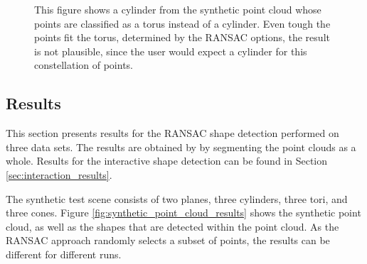\begin{figure}[h]
\centering
{}%
{}      
\caption{This figure shows a cylinder from the synthetic point cloud whose points are classified as a torus instead of a cylinder. Even tough the points fit the torus, determined by the RANSAC options, the result is not plausible, since the user would expect a cylinder for this constellation of points. }
\label{fig:missfittedTorus}
\end{figure}


\subsection{Results}

This section presents results for the RANSAC shape detection performed on three data sets. The results are obtained by by segmenting the point clouds as a whole. Results for the interactive shape detection can be found in Section \ref{sec:interaction_results}. 

The synthetic test scene consists of two planes, three cylinders, three tori, and three cones.  Figure \ref{fig:synthetic_point_cloud_results} shows the synthetic point cloud, as well as the shapes that are detected within the point cloud. As the RANSAC approach randomly selects a subset of points, the results can be different for different runs. 

